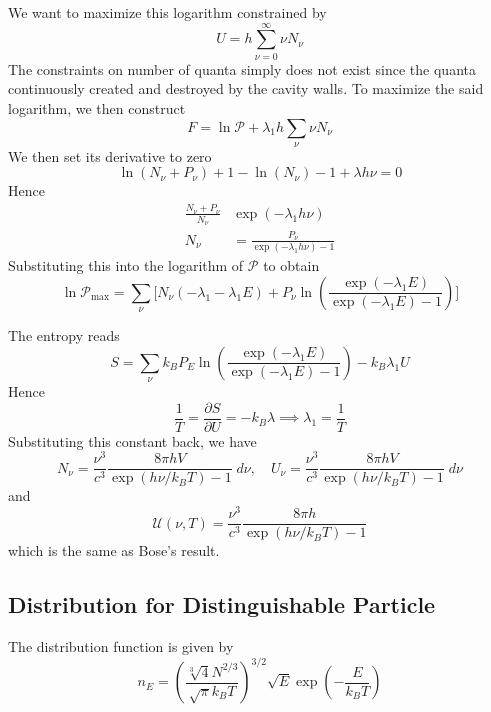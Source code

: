 \documentclass[../../../Main.tex]{subfiles}
\begin{document}
We want to maximize this logarithm constrained by 
\begin{equation*}
    U=h\sum_{\nu=0}^{\infty} \nu N_\nu
\end{equation*}
The constraints on number of quanta simply does not exist since the quanta continuously created and destroyed by the cavity walls. To maximize the said logarithm, we then construct
\begin{equation*}
    F=\ln \mathcal{P}+\lambda_1h\sum_{\nu} \nu N_\nu
\end{equation*}
We then set its derivative to zero 
\begin{equation*}
    \ln(N_\nu+P_\nu) +1 -\ln(N_\nu) -1 +\lambda h\nu=0
\end{equation*}
Hence
\begin{align*}
    \frac{N_\nu+P_\nu}{N_\nu}&\exp(-\lambda_1h\nu)\\
    N_\nu&=\frac{P_\nu}{\exp(-\lambda_1 h\nu)-1}
\end{align*}
Substituting this into the logarithm of $\mathcal{P}$ to obtain
\begin{equation*}
    \ln \mathcal{P}_{\max}=\sum_\nu \Bigg[N_\nu \left(-\lambda_1-\lambda_1 E\right)
    + P_\nu\ln\left(\frac{\exp(-\lambda_1E)}{\exp(-\lambda_1E)-1}\right)\Bigg]
\end{equation*}

The entropy reads
\begin{equation*}
    S=\sum_\nu k_B P_E \ln\left(\frac{\exp(-\lambda_1E)}{\exp(-\lambda_1E)-1}\right)-k_B\lambda_1 U
\end{equation*}
Hence 
\begin{equation*}
    \frac{1}{T}=\frac{\partial S}{\partial U}=-k_B\lambda\implies \lambda_1=\frac{1}{T}
\end{equation*}
Substituting this constant back, we have
\begin{equation*}
    N_\nu=\frac{\nu^3}{c^3}\frac{8\pi h V}{\exp(h\nu/k_BT)-1}\;d\nu,\quad     U_\nu=\frac{\nu^3}{c^3}\frac{8\pi h V}{\exp(h\nu/k_BT)-1}\;d\nu 
\end{equation*}
and
\begin{equation*}
    \mathcal{U}(\nu,T) =\frac{\nu^3}{c^3}\frac{8\pi h}{\exp(h\nu/k_BT)-1}
\end{equation*}
which is the same as Bose's result.
 
\subsection*{Distribution for Distinguishable Particle}
The distribution function is given by 
\begin{equation*}
    n_E=\left(\frac{\sqrt[3]{4} N^{2/3}}{\sqrt{\pi}k_B T}\right)^{3/2} \sqrt{E}\exp\left(-\frac{E}{k_BT}\right)
\end{equation*}
\end{document}
